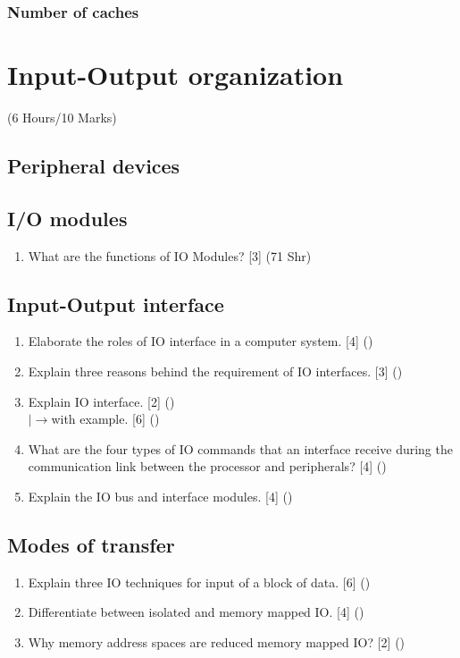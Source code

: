 \documentclass[12pt]{article}
\newcommand{\lb}{\\$\left|\rightarrow\right.$}
\begin{document}
	\subsubsection{Number of caches}

\pagebreak
\section{Input-Output organization}
	\begin{center}(6 Hours/10 Marks)\end{center}
	\subsection{Peripheral devices}
	\subsection{I/O modules}
		\begin{enumerate}
			\item What are the functions of IO Modules? \hfill [3] (71 Shr)
		\end{enumerate}

	\subsection{Input-Output interface}
		\begin{enumerate}
			\item Elaborate the roles of IO interface in a computer system. \hfill [4] ()

			\item Explain three reasons behind the requirement of IO interfaces. \hfill [3] ()

			\item Explain IO interface. \hfill [2] ()
			\lb with example. \hfill [6] ()

			\item What are the four types of IO commands that an interface receive during the communication link between the processor and peripherals? \hfill [4] ()

			\item Explain the IO bus and interface modules. \hfill [4] ()
		\end{enumerate}

	\subsection{Modes of transfer}
		\begin{enumerate}
			\item Explain three IO techniques for input of a block of data. \hfill [6] ()

			\item Differentiate between isolated and memory mapped IO. \hfill [4] ()

			\item Why memory address spaces are reduced memory mapped IO? \hfill [2] ()
		\end{enumerate}
\end{document}
